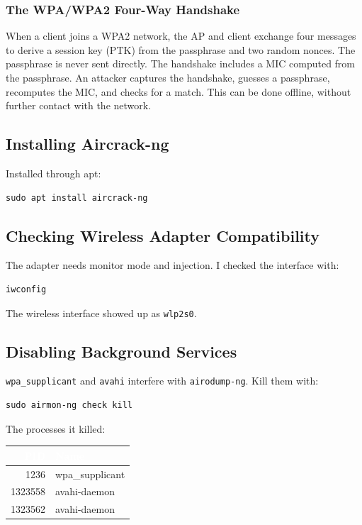 \documentclass[12pt,a4paper]{article}
\begin{document}
\subsubsection{The WPA/WPA2 Four-Way Handshake}

When a client joins a WPA2 network, the AP and client exchange four messages to derive a session key (PTK) from the passphrase and two random nonces. The passphrase is never sent directly. The handshake includes a MIC computed from the passphrase. An attacker captures the handshake, guesses a passphrase, recomputes the MIC, and checks for a match. This can be done offline, without further contact with the network.

\subsection{Installing Aircrack-ng}

Installed through apt:

\begin{lstlisting}
sudo apt install aircrack-ng
\end{lstlisting}

\subsection{Checking Wireless Adapter Compatibility}

The adapter needs monitor mode and injection. I checked the interface with:

\begin{lstlisting}
iwconfig
\end{lstlisting}

The wireless interface showed up as \texttt{wlp2s0}.

\subsection{Disabling Background Services}

\texttt{wpa\_supplicant} and \texttt{avahi} interfere with \texttt{airodump-ng}. Kill them with:

\begin{lstlisting}
sudo airmon-ng check kill
\end{lstlisting}

The processes it killed:

\begin{tabularx}{\textwidth}{r X}
\arrayrulecolor{accent!40}
\toprule
\rowcolor{tableheadbg}
\textcolor{white}{\textbf{PID}} & \textcolor{white}{\textbf{Name}} \\
\midrule
1236    & wpa\_supplicant \\
\rowcolor{tablerowalt}
1323558 & avahi-daemon \\
1323562 & avahi-daemon \\
\bottomrule
\end{tabularx}
\end{document}
